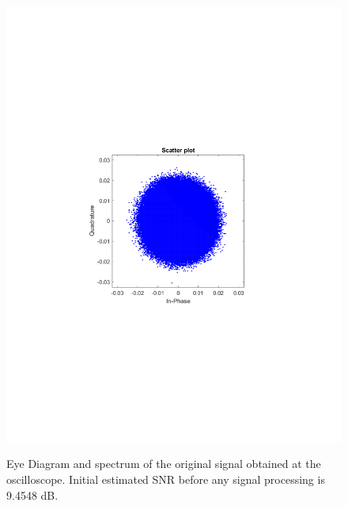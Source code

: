 \begin{refsection}
\begin{figure}[H]
\begin{minipage}{0.30\textwidth}
		\includegraphics[clip, trim=4cm 8cm 4cm 8cm, width=1\textwidth]{./sdf/m_qam_system/figures/expResults/intradyne/0_const_16GBdInSig13dB_bfFec.pdf}
		\label{fig:16GBdSpecBefFec}
	\end{minipage}
	\caption{Eye Diagram and spectrum of the original signal obtained at the oscilloscope. Initial estimated SNR before any signal processing is 9.4548 dB.}
	\label{fig:16GBdinit}
\end{figure}


\end{refsection}
